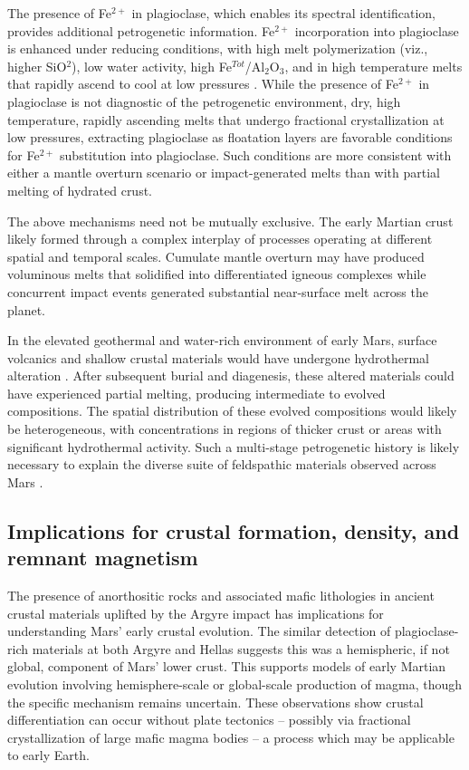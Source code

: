 \documentclass[11pt]{article}
\begin{document}
The presence of Fe$^{2+}$ in plagioclase, which enables its spectral identification, provides additional petrogenetic information. Fe$^{2+}$ incorporation into plagioclase is enhanced under reducing conditions, with high melt polymerization (viz., higher SiO$^2$), low water activity, high Fe$^{Tot}$/Al$_{2}$O$_{3}$, and in high temperature melts that rapidly ascend to cool at low pressures \citep{Wenk1973, Longhi1976, Smith1988, Phinney1992, Ashwal1993, Lundgaard2004}. While the presence of Fe$^{2+}$ in plagioclase is not diagnostic of the petrogenetic environment, dry, high temperature, rapidly ascending melts that undergo fractional crystallization at low pressures, extracting plagioclase as floatation layers are favorable conditions for Fe$^{2+}$ substitution into plagioclase. Such conditions are more consistent with either a mantle overturn scenario or impact-generated melts than with partial melting of hydrated crust.

The above mechanisms need not be mutually exclusive. The early Martian crust likely formed through a complex interplay of processes operating at different spatial and temporal scales. Cumulate mantle overturn may have produced voluminous melts that solidified into differentiated igneous complexes while concurrent impact events generated substantial near-surface melt across the planet.

In the elevated geothermal and water-rich environment of early Mars, surface volcanics and shallow crustal materials would have undergone hydrothermal alteration \citep{Viviano2019}. After subsequent burial and diagenesis, these altered materials could have experienced partial melting, producing intermediate to evolved compositions. The spatial distribution of these evolved compositions would likely be heterogeneous, with concentrations in regions of thicker crust or areas with significant hydrothermal activity. Such a multi-stage petrogenetic history is likely necessary to explain the diverse suite of feldspathic materials observed across Mars \citep{Carter2013, Wray2013, Rogers2015, Viviano-Beck2017, Farrand2021, Payre2022, Payre2024, Phillips2022, Flahaut2023, Michalski2023}.

\subsection*{Implications for crustal formation, density, and remnant magnetism}

The presence of anorthositic rocks and associated mafic lithologies in ancient crustal materials uplifted by the Argyre impact has implications for understanding Mars' early crustal evolution. The similar detection of plagioclase-rich materials at both Argyre and Hellas \citep{Phillips2022} suggests this was a hemispheric, if not global, component of Mars' lower crust. This supports models of early Martian evolution involving hemisphere-scale or global-scale production of magma, though the specific mechanism remains uncertain. These observations show crustal differentiation can occur without plate tectonics -- possibly via fractional crystallization of large mafic magma bodies -- a process which may be applicable to early Earth.
\end{document}
